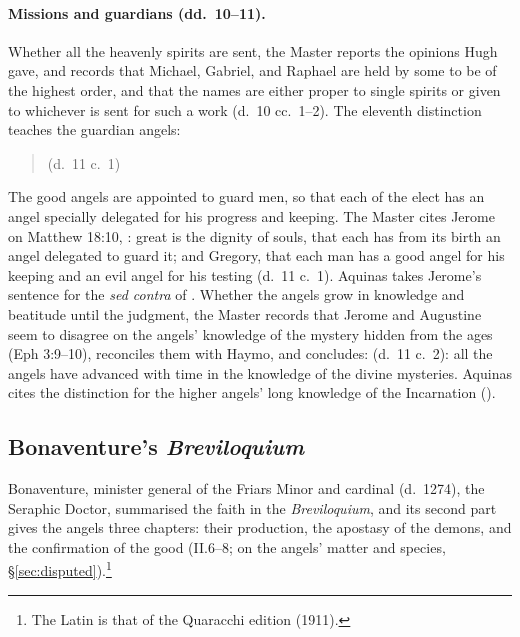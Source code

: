 \paragraph{Missions and guardians (dd.~10--11).} Whether all the heavenly
spirits are sent, the Master reports the opinions Hugh gave, and records
that Michael, Gabriel, and Raphael are held by some to be of the highest
order, and that the names are either proper to single spirits or given to
whichever is sent for such a work (d.~10 cc.~1--2). The eleventh
distinction teaches the guardian angels:

\begin{quote}
 (d.~11 c.~1)
\end{quote}

\noindent The good angels are appointed to guard men, so that each of the
elect has an angel specially delegated for his progress and keeping. The
Master cites Jerome on Matthew 18:10, :
great is the dignity of souls, that each has from its birth an angel
delegated to guard it; and Gregory, that each man has a good angel for his
keeping and an evil angel for his testing (d.~11 c.~1). Aquinas takes
Jerome's sentence for the \emph{sed contra} of . Whether
the angels grow in knowledge and beatitude until the judgment, the Master
records that Jerome and Augustine seem to disagree on the angels' knowledge
of the mystery hidden from the ages (Eph 3:9--10), reconciles them with
Haymo, and concludes:  (d.~11 c.~2):
all the angels have advanced with time in the knowledge of the divine
mysteries. Aquinas cites the distinction for the higher angels' long
knowledge of the Incarnation ().

\sectionguard
\subsection{Bonaventure's \emph{Breviloquium}}\label{sec:fa-bonaventure}

Bonaventure, minister general of the Friars Minor and cardinal (d.~1274),
the Seraphic Doctor, summarised the faith in the \emph{Breviloquium}, and
its second part gives the angels three chapters: their production, the
apostasy of the demons, and the confirmation of the good (II.6--8; on the
angels' matter and species, \S\ref{sec:disputed}).\footnote{The
Latin is that of the Quaracchi edition (1911).}

